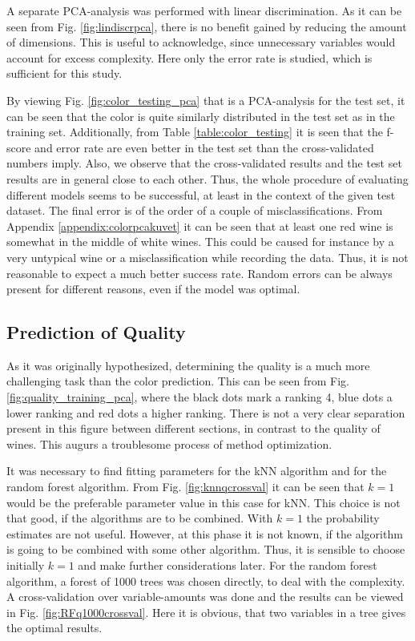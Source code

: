 \documentclass[twoside]{article}
\begin{document}
\begin{multicols}{2}
A separate PCA-analysis was performed with linear discrimination. As it can be seen from Fig. \ref{fig:lindiscrpca}, there is no
benefit gained by reducing the amount of dimensions. This is useful to acknowledge, since unnecessary variables would
account for excess complexity. Here only the error rate is studied, which is sufficient for this study.

By viewing Fig. \ref{fig:color_testing_pca} that is a PCA-analysis for the test set, it can be seen that the color is quite similarly 
distributed in the test set as in the training set. Additionally, from Table \ref{table:color_testing} it is seen that the f-score and
error rate are even better in the test set than the cross-validated numbers imply. Also, we observe that the cross-validated results and the
test set results are in general close to each other. Thus, the whole procedure of evaluating different models seems to be successful,
at least in the context of the given test dataset. The final error is of the order of a couple of misclassifications. From Appendix
\ref{appendix:colorpcakuvet} it can be seen that at least one red wine is somewhat in the middle of white wines. This could be caused for instance 
by a very untypical wine or a misclassification while recording the data. Thus, it is not reasonable to expect a much better success rate. Random
errors can be always present for different reasons, even if the model was optimal.

\subsection{Prediction of Quality}

As it was originally hypothesized, determining the quality is a much more challenging task than the color prediction. This can be seen from Fig.
\ref{fig:quality_training_pca}, where the black dots mark a ranking 4, blue dots a lower ranking and red dots a higher ranking. There is not a
very clear separation present in this figure between different sections, in contrast to the quality of wines. This augurs a troublesome
process of method optimization.

It was necessary to find fitting parameters for the kNN algorithm and for the random forest algorithm. From Fig. \ref{fig:knnqcrossval}
it can be seen that $k = 1$ would be the preferable parameter value in this case for kNN. This choice is not that good, if the algorithms are to be combined.
With $k = 1$ the probability estimates are not useful. However, at this phase it is not known, if the algorithm is going to be combined with some other
algorithm. Thus, it is sensible to choose initially $k = 1$ and make further considerations later. For the random forest algorithm, 
a forest of 1000 trees was chosen directly, to deal with the complexity. A cross-validation over variable-amounts was done
and the results can be viewed in Fig. \ref{fig:RFq1000crossval}. Here it is obvious, that two variables in a tree gives the optimal results.


\end{multicols}
\end{document}
